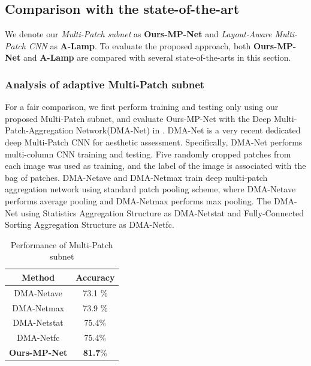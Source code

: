 \documentclass[10pt,twocolumn,letterpaper]{article}
\begin{document}
\subsection{Comparison with the state-of-the-art}
We denote our \textit{Multi-Patch subnet} as \textbf{Ours-MP-Net} and \textit{Layout-Aware Multi-Patch CNN} as \textbf{A-Lamp}. To evaluate the proposed approach, both \textbf{Ours-MP-Net} and \textbf{A-Lamp} are compared with several state-of-the-arts in this section.

\subsubsection{Analysis of adaptive Multi-Patch subnet}
For a fair comparison, we first perform training and testing only using our proposed Multi-Patch subnet, and evaluate Ours-MP-Net with the Deep Multi-Patch-Aggregation Network(DMA-Net) in \cite{Lu:2015:ICCV}. DMA-Net is a very recent dedicated deep Multi-Patch CNN for aesthetic assessment.
Specifically, DMA-Net performs multi-column CNN training and testing. Five randomly cropped patches from each image was used as training, and the label of the image is associated with the bag of patches. DMA-Net{\tiny ave} and DMA-Net{\tiny max} train deep multi-patch aggregation network using standard patch pooling scheme, where DMA-Net{\tiny ave} performs average pooling and DMA-Net{\tiny max} performs max pooling. The DMA-Net using Statistics Aggregation Structure as DMA-Net{\tiny stat} and Fully-Connected Sorting Aggregation Structure as DMA-Net{\tiny fc}. 

\begin{table}
	\begin{center}	
		\begin{tabular}{||c|c||} 
			\hline
			Method & Accuracy \\
			\hline\hline
			DMA-Net{\tiny ave} & 73.1 $\%$ \\
			DMA-Net{\tiny max} & 73.9 $\%$ \\
			DMA-Net{\tiny stat} & 75.4$\% $ \\
			DMA-Net{\tiny fc} & 75.4$\% $ \\
			\hline
			\textbf{Ours-MP-Net} & \textbf{81.7$\% $}\\
			\hline
		\end{tabular} \label{tabel1} 
	\end{center} 
\caption{Performance of Multi-Patch subnet}
\end{table}
\end{document}
